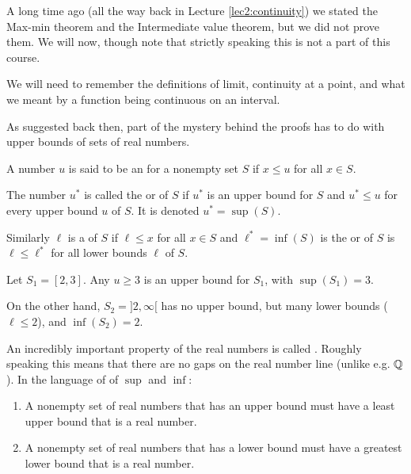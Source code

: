 

A long time ago (all the way back in Lecture \ref{lec2:continuity}) we stated the Max-min theorem and the Intermediate value theorem, but we did not prove them.
We will now, though note that strictly speaking this is not a part of this course.

We will need to remember the definitions of limit, continuity at a point, and what we meant by a function being continuous on an interval.

As suggested back then, part of the mystery behind the proofs has to do with upper bounds of sets of real numbers.

\begin{definition}
	A number $u$ is said to be an  for a nonempty set $S$ if $x \leq u$ for all $x \in S$.

	The number $u^*$ is called the  or  of $S$ if $u^*$ is an upper bound for $S$ and $u^* \leq u$ for every upper bound $u$ of $S$.
	It is denoted $u^* = \sup(S)$.

	Similarly $\ell$ is a  of $S$ if $\ell \leq x$ for all $x \in S$ and $\ell^* = \inf(S)$ is the  or  of $S$ is $\ell \leq \ell^*$ for all lower bounds $\ell$ of $S$.
\end{definition}

\begin{example}
	Let $S_1 = [2, 3]$. Any $u \geq 3$ is an upper bound for $S_1$, with $\sup(S_1) = 3$.

	On the other hand, $S_2 = {]{2, \infty}[}$ has no upper bound, but many lower bounds ($\ell \leq 2$), and $\inf(S_2) = 2$.
\end{example}

\noindent
An incredibly important property of the real numbers is called .
Roughly speaking this means that there are no gaps on the real number line (unlike e.g. $\mathbb{Q}$).
In the language of of $\sup$ and $\inf$:
\begin{enumerate}
	\item A nonempty set of real numbers that has an upper bound must have a least upper bound that is a real number.
	\item A nonempty set of real numbers that has a lower bound must have a greatest lower bound that is a real number.
\end{enumerate}

